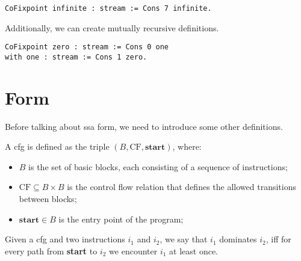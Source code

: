 \begin{lstlisting}[style=Rocq]
CoFixpoint infinite : stream := Cons 7 infinite.
\end{lstlisting}

Additionally, we can create mutually recursive definitions.

\begin{lstlisting}[style=Rocq]
CoFixpoint zero : stream := Cons 0 one
with one : stream := Cons 1 zero.
\end{lstlisting}



\section{ Form}
\label{sec:ssa}


Before talking about \gls{ssa} form, we need to introduce some other definitions.

\begin{definition}\label{def:cfg}
  A \gls{cfg} is defined as the triple $(B, \text{CF}, \textbf{start})$, where:
  \begin{itemize}
    \item $B$ is the set of basic blocks, each consisting of a sequence of instructions;
    \item $\text{CF} \subseteq B \times B$ is the control flow relation that defines the allowed transitions between blocks;
    \item $\textbf{start} \in B$ is the entry point of the program;
  \end{itemize}
\end{definition}

\begin{definition}[Dominance]
  Given a \gls{cfg} and two instructions $i_1$ and $i_2$, we say that $i_1$ dominates $i_2$, iff for every path from \textbf{start} to $i_2$ we encounter $i_1$ at least once.
\end{definition}

